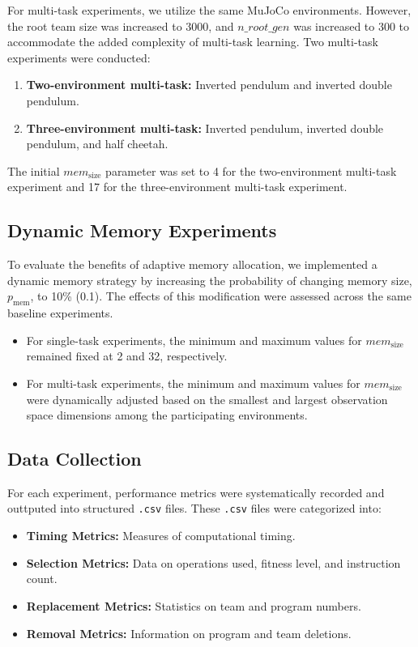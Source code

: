 \documentclass[sigconf]{acmart}
\begin{document}
For multi-task experiments, we utilize the same MuJoCo environments. However, the root team size was increased to 3000,
and $n\_root\_gen$ was increased to 300 to accommodate the added complexity of multi-task learning. Two multi-task
experiments were conducted:

\begin{enumerate}
  \item \textbf{Two-environment multi-task:} Inverted pendulum and inverted double pendulum.
  \item \textbf{Three-environment multi-task:} Inverted pendulum, inverted double pendulum, and half cheetah.
\end{enumerate}

The initial $mem_\text{size}$ parameter was set to 4 for the two-environment multi-task experiment and 17 for the three-environment
multi-task experiment.

\subsection{Dynamic Memory Experiments}
To evaluate the benefits of adaptive memory allocation, we implemented a dynamic memory strategy by increasing the probability
of changing memory size, $p_\text{mem}$, to 10\% (0.1). The effects of this modification were assessed across the same baseline experiments.

\begin{itemize}
  \item For single-task experiments, the minimum and maximum values for $mem_\text{size}$ remained fixed at 2 and 32, respectively.
  \item For multi-task experiments, the minimum and maximum values for $mem_\text{size}$ were dynamically adjusted based on the smallest
  and largest observation space dimensions among the participating environments.
\end{itemize}

\subsection{Data Collection}
For each experiment, performance metrics were systematically recorded and outtputed into structured \texttt{.csv} files. 
These \texttt{.csv} files were categorized into:

\begin{itemize}
  \item \textbf{Timing Metrics:} Measures of computational timing.
  \item \textbf{Selection Metrics:} Data on operations used, fitness level, and instruction count.
  \item \textbf{Replacement Metrics:} Statistics on team and program numbers.
  \item \textbf{Removal Metrics:} Information on program and team deletions.
\end{itemize}
\end{document}
